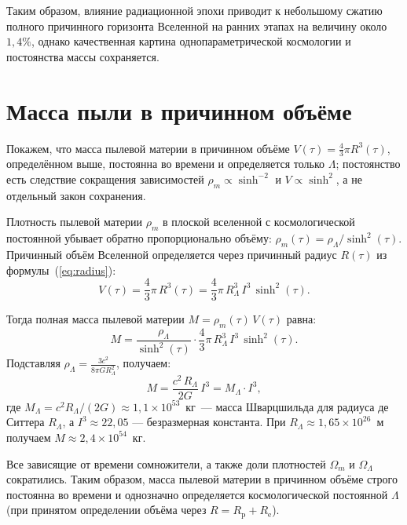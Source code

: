 \documentclass[12pt,a4paper]{article}
\begin{document}
Таким образом, влияние радиационной эпохи приводит к небольшому сжатию полного причинного горизонта Вселенной на ранних этапах на величину около $1{,}4\%$, однако качественная картина однопараметрической космологии и постоянства массы сохраняется.

\section{Масса пыли в причинном объёме}
\label{sec:mass}

Покажем, что масса пылевой материи в причинном объёме $V(\tau)=\tfrac{4}{3}\pi R^3(\tau)$, определённом выше, постоянна во времени и определяется только $\Lambda$; постоянство есть следствие сокращения зависимостей $\rho_m\propto\sinh^{-2}$ и $V\propto\sinh^{2}$, а не отдельный закон сохранения.

Плотность пылевой материи $\rho_m$ в плоской вселенной с космологической постоянной убывает обратно пропорционально объёму: $\rho_m(\tau) = \rho_\Lambda / \sinh^2(\tau)$. Причинный объём Вселенной определяется через причинный радиус $R(\tau)$ из формулы~(\ref{eq:radius}):
\begin{equation}
V(\tau) = \frac{4}{3}\pi\,R^3(\tau) = \frac{4}{3}\pi\,R_\Lambda^3\,I^3\,\sinh^2(\tau).
\end{equation}

Тогда полная масса пылевой материи $M = \rho_m(\tau)\,V(\tau)$ равна:
\begin{equation}
M = \frac{\rho_\Lambda}{\sinh^2(\tau)} \cdot \frac{4}{3}\pi\,R_\Lambda^3\,I^3\,\sinh^2(\tau).
\end{equation}
Подставляя $\rho_\Lambda = \frac{3 c^2}{8\pi G R_\Lambda^2}$, получаем:
\begin{equation}
\boxed{M = \frac{c^2\,R_\Lambda}{2G}\,I^3 = M_\Lambda \cdot I^3,}
\end{equation}
где $M_\Lambda = c^2 R_\Lambda / (2G) \approx 1{,}1 \times 10^{53}$~кг~--- масса Шварцшильда для радиуса де Ситтера $R_\Lambda$, а $I^3 \approx 22{,}05$ --- безразмерная константа. При $R_\Lambda \approx 1{,}65 \times 10^{26}$~м получаем $M \approx 2{,}4 \times 10^{54}$~кг.

Все зависящие от времени сомножители, а также доли плотностей $\Omega_m$ и $\Omega_\Lambda$ сократились. Таким образом, масса пылевой материи в причинном объёме строго постоянна во времени и однозначно определяется космологической постоянной $\Lambda$ (при принятом определении объёма через $R=R_{\mathrm{p}}+R_{\mathrm{e}}$).
\end{document}
